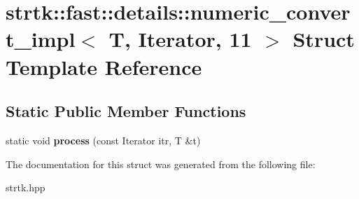 \hypertarget{structstrtk_1_1fast_1_1details_1_1numeric__convert__impl_3_01T_00_01Iterator_00_0111_01_4}{\section{strtk\-:\-:fast\-:\-:details\-:\-:numeric\-\_\-convert\-\_\-impl$<$ T, Iterator, 11 $>$ Struct Template Reference}
\label{structstrtk_1_1fast_1_1details_1_1numeric__convert__impl_3_01T_00_01Iterator_00_0111_01_4}
}
\subsection*{Static Public Member Functions}
\begin{DoxyCompactItemize}
\item 
\hypertarget{structstrtk_1_1fast_1_1details_1_1numeric__convert__impl_3_01T_00_01Iterator_00_0111_01_4_a7b3b43fc61b30916552dd272c4591a09}{static void {\bfseries process} (const Iterator itr, T \&t)}\label{structstrtk_1_1fast_1_1details_1_1numeric__convert__impl_3_01T_00_01Iterator_00_0111_01_4_a7b3b43fc61b30916552dd272c4591a09}

\end{DoxyCompactItemize}


The documentation for this struct was generated from the following file\-:\begin{DoxyCompactItemize}
\item 
strtk.\-hpp\end{DoxyCompactItemize}
